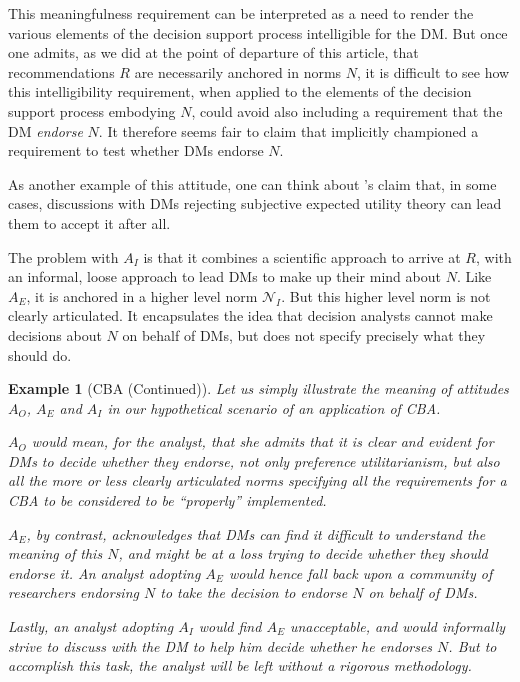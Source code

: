 \documentclass[preprint, french, english, 11pt, authoryear]{elsarticle}%
\newtheorem{example}{Example}
\begin{document}
This meaningfulness requirement can be interpreted as a need to render the various elements of the decision support process intelligible for the \ac{DM}. But once one admits, as we did at the point of departure of this article, that recommendations $R$ are necessarily anchored in norms $N$, it is difficult to see how this intelligibility requirement, when applied to  the elements of the decision support process embodying $N$, could avoid also including a requirement that the \ac{DM} \emph{endorse} $N$. It therefore seems fair to claim that \citet{roy_multicriteria_1996} implicitly championed a requirement to test whether \acp{DM} endorse $N$. 

As another example of this attitude, one can think about \citet{raiffa_back_1985}’s claim that, in some cases, discussions with \acp{DM} rejecting subjective expected utility theory can lead them to accept it after all.

The problem with $A_I$ is that it combines a scientific approach to arrive at $R$, with an informal, loose approach to lead \acp{DM} to make up their mind about $N$.
Like $A_E$, it is anchored in a higher level norm $\mathscr{N}_I$. But this higher level norm is not clearly articulated. It encapsulates the idea that decision analysts cannot make decisions about $N$ on behalf of \acp{DM}, but does not specify precisely what they should do.

\begin{example}[CBA (Continued)]
Let us simply illustrate the meaning of attitudes $A_O$, $A_E$ and $A_I$ in our hypothetical scenario of an application of CBA.

$A_O$ would mean, for the analyst, that she admits that it is clear and evident for \acp{DM} to decide whether they endorse, not only preference utilitarianism, but also all the more or less clearly articulated norms specifying all the requirements for a CBA to be considered to be ``properly'' implemented.

$A_E$, by contrast, acknowledges that \acp{DM} can find it difficult to understand the meaning of this $N$, and might be at a loss trying to decide whether they should endorse it. An analyst adopting $A_E$ would hence fall back upon a community of researchers endorsing $N$ to take the decision to endorse $N$ on behalf of \acp{DM}.

Lastly, an analyst adopting $A_I$ would find $A_E$ unacceptable, and would informally strive to discuss with the \ac{DM} to help him decide whether he endorses $N$. But to accomplish this task, the analyst will be left without a rigorous methodology.
\end{example}
\end{document}
